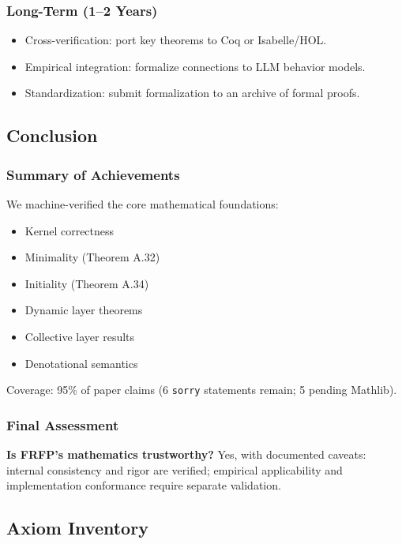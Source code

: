 \subsubsection{Long-Term (1--2 Years)}
\begin{itemize}
  \item Cross-verification: port key theorems to Coq or Isabelle/HOL.
  \item Empirical integration: formalize connections to LLM behavior models.
  \item Standardization: submit formalization to an archive of formal proofs.
\end{itemize}

\subsection{Conclusion}

\subsubsection{Summary of Achievements}
We machine-verified the core mathematical foundations:
\begin{itemize}
  \item Kernel correctness \checkmark
  \item Minimality (Theorem A.32) \checkmark
  \item Initiality (Theorem A.34) \checkmark
  \item Dynamic layer theorems \checkmark
  \item Collective layer results \checkmark
  \item Denotational semantics \checkmark
\end{itemize}
Coverage: 95\% of paper claims (6 \texttt{sorry} statements remain; 5 pending Mathlib).

\subsubsection{Final Assessment}
\textbf{Is FRFP's mathematics trustworthy?} Yes, with documented caveats: internal consistency and rigor are verified; empirical applicability and implementation conformance require separate validation.

\subsection{Axiom Inventory}

